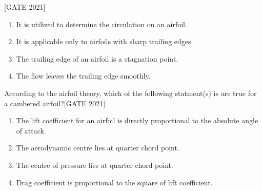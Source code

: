  \hfill{[GATE 2021]}\begin{enumerate}
    \item It is utilized to determine the circulation on an airfoil.
    \item It is applicable only to airfoils with sharp trailing edges.
    \item The trailing edge of an airfoil is a stagnation point.
    \item The flow leaves the trailing edge smoothly.
\end{enumerate}
\item According to the airfoil theory, which of the following statment(s) is are true for a cambered airfoil?\hfill{[GATE 2021]}\begin{enumerate}
\item The lift coefficient for an airfoil is directly proportional to the absolute angle of attack. 
\item The aerodynamic centre lies at quarter chord point.
\item The centre of pressure lies at quarter chord point.
\item Drag coefficient is proportional to the square of lift coefficient.
\end{enumerate}

